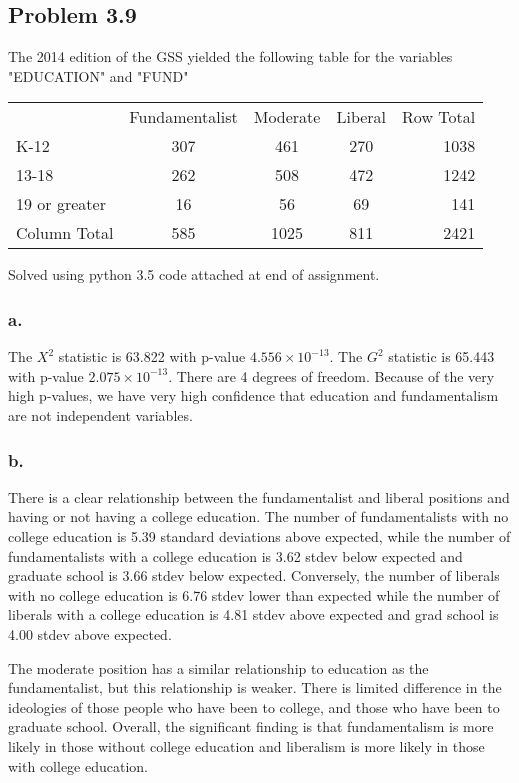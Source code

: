 \documentclass{article}
\begin{document}
\subsection{Problem 3.9}
The 2014 edition of the GSS yielded the following table for the variables "EDUCATION" and "FUND"
\begin{center}
\begin{tabular}{l c c c r}
&Fundamentalist&Moderate&Liberal&Row Total \\
K-12&307&461&270&1038 \\
13-18&262&508&472&1242 \\
19 or greater&16&56&69&141 \\
Column Total&585&1025&811&2421 
\end{tabular}
\end{center}
Solved using python 3.5 code attached at end of assignment. 
\subsubsection{a.}
The $X^2$ statistic is 63.822 with p-value $4.556\times10^{-13}$. The $G^2$ statistic is 65.443 with p-value $2.075\times10^{-13}$. There are 4 degrees of freedom. Because of the very high p-values, we have very high confidence that education and fundamentalism are not independent variables. 
\subsubsection{b.} 
There is a clear relationship between the fundamentalist and liberal positions and having or not having a college education. The number of fundamentalists with no college education is 5.39 standard deviations above expected, while the number of  fundamentalists with a college education is 3.62 stdev below expected and graduate school is 3.66 stdev below expected. Conversely, the number of liberals with no college education is 6.76 stdev lower than expected while the number of liberals with a college education is 4.81 stdev above expected and grad school is 4.00 stdev above expected.

The moderate position has a similar relationship to education as the fundamentalist, but this relationship is weaker. There is limited difference in the ideologies of those people who have been to college, and those who have been to graduate school. Overall, the significant finding is that fundamentalism is more likely in those without college education and liberalism is more likely in those with college education. 
\end{document}

